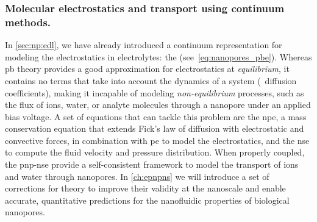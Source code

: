 \subsubsection{Molecular electrostatics and transport using continuum methods.}
%

In \cref{sec:np:edl}, we have already introduced a continuum representation for modeling the electrostatics in
electrolytes: the  (see~\cref{eq:nanopores_pbe}). Whereas \gls{pb} theory provides a good
approximation for electrostatics at \emph{equilibrium}, it contains no terms that take into account the
dynamics of a system (\eg~diffusion coefficients), making it incapable of modeling \emph{non-equilibrium}
processes, such as the flux of ions, water, or analyte molecules through a nanopore under an applied bias
voltage. A set of equations that can tackle this problem are the \gls{npe}, a mass conservation equation that
extends Fick's law of diffusion with electrostatic and convective forces, in combination with \gls{pe} to
model the electrostatics, and the \gls{nse} to compute the fluid velocity and pressure distribution. When
properly coupled, the \gls{pnp-nse} provide a self-consistent framework to model the transport of ions and
water through nanopores. In \cref{ch:epnpns} we will introduce a set of corrections for
 theory to improve their validity at the nanoscale and enable accurate, quantitative
predictions for the nanofluidic properties of biological nanopores.

